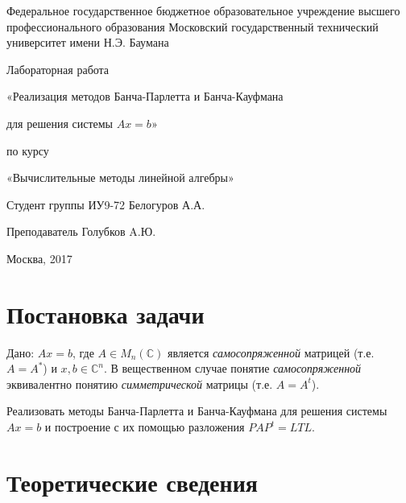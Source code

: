 \documentclass[a4paper, 12pt]{article}   	%
\begin{document}
\begin{titlepage}

\thispagestyle{empty}

\begin{center}
Федеральное государственное бюджетное образовательное учреждение высшего профессионального образования Московский государственный технический университет имени Н.Э. Баумана
\end{center}


\vfill

\centerline{\large{Лабораторная работа}}

\centerline{\large{«Реализация методов Банча-Парлетта и Банча-Кауфмана}} 
\centerline{\large{для решения системы $Ax = b$»}}

\centerline{\large{по курсу}}
\centerline{\large{«Вычислительные методы линейной алгебры»}}


\vfill

Студент группы ИУ9-72 \hfill Белогуров А.А.

Преподаватель \hfill Голубков A.Ю.
\vfill

\centerline{Москва, 2017}
\clearpage
\end{titlepage}

\newpage
\setcounter{page}{2}

\tableofcontents

\newpage

\section{Постановка задачи}


Дано: $Ax=b$, где $A \in M_n(\mathds{C})$ является {\it самосопряженной} матрицей (т.е. $A = A^*$) и $x, b \in \mathds{C}^n$. В вещественном случае понятие {\it самосопряженной} эквивалентно понятию {\it симметрической} матрицы (т.е. $A = A^t$). 

Реализовать методы Банча-Парлетта и Банча-Кауфмана для решения системы $Ax = b$ и построение с их помощью разложения $PAP^t = LTL$.

\newpage

\section{Теоретические сведения}
\end{document}
